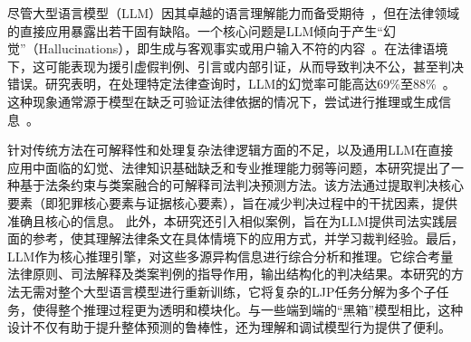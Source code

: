 尽管大型语言模型（LLM）因其卓越的语言理解能力而备受期待~\cite{jiang2023legal}，但在法律领域的直接应用暴露出若干固有缺陷。一个核心问题是LLM倾向于产生“幻觉”（Hallucinations），即生成与客观事实或用户输入不符的内容~\cite{lewis2020retrieval,zheng2021when}。在法律语境下，这可能表现为援引虚假判例、引言或内部引证，从而导致判决不公，甚至判决错误。研究表明，在处理特定法律查询时，LLM的幻觉率可能高达69\%至88\%~\cite{Dahl_2024}。这种现象通常源于模型在缺乏可验证法律依据的情况下，尝试进行推理或生成信息~\cite{zhong2020iteratively,zhong2020jec-qa}。

针对传统方法在可解释性和处理复杂法律逻辑方面的不足，以及通用LLM在直接应用中面临的幻觉、法律知识基础缺乏和专业推理能力弱等问题，本研究提出了一种基于法条约束与类案融合的可解释司法判决预测方法。该方法通过提取判决核心要素（即犯罪核心要素与证据核心要素），旨在减少判决过程中的干扰因素，提供准确且核心的信息。
此外，本研究还引入相似案例，旨在为LLM提供司法实践层面的参考，使其理解法律条文在具体情境下的应用方式，并学习裁判经验。最后，LLM作为核心推理引擎，对这些多源异构信息进行综合分析和推理。它综合考量法律原则、司法解释及类案判例的指导作用，输出结构化的判决结果。本研究的方法无需对整个大型语言模型进行重新训练，它将复杂的LJP任务分解为多个子任务，使得整个推理过程更为透明和模块化。与一些端到端的“黑箱”模型相比，这种设计不仅有助于提升整体预测的鲁棒性，还为理解和调试模型行为提供了便利。
